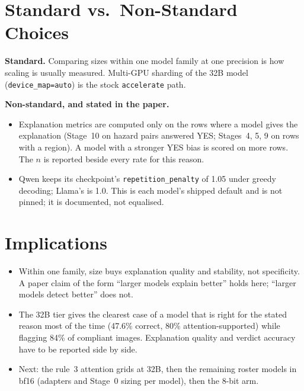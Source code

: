 \section{Standard vs.\ Non-Standard Choices}

\textbf{Standard.} Comparing sizes within one model family at one precision is how scaling is usually
measured. Multi-GPU sharding of the 32B model (\texttt{device\_map=auto}) is the stock \texttt{accelerate}
path.

\textbf{Non-standard, and stated in the paper.}
\begin{itemize}
\item Explanation metrics are computed only on the rows where a model gives the explanation (Stage~10 on
hazard pairs answered YES; Stages~4, 5, 9 on rows with a region). A model with a stronger YES bias is
scored on more rows. The $n$ is reported beside every rate for this reason.
\item Qwen keeps its checkpoint's \texttt{repetition\_penalty} of 1.05 under greedy decoding; Llama's is
1.0. This is each model's shipped default and is not pinned; it is documented, not equalised.
\end{itemize}

\section{Implications}

\begin{itemize}
\item Within one family, size buys explanation quality and stability, not specificity. A paper claim of
the form ``larger models explain better'' holds here; ``larger models detect better'' does not.
\item The 32B tier gives the clearest case of a model that is right for the stated reason most of the time
(47.6\% correct, 80\% attention-supported) while flagging 84\% of compliant images. Explanation quality and
verdict accuracy have to be reported side by side.
\item Next: the rule~3 attention grids at 32B, then the remaining roster models in bf16 (adapters and
Stage~0 sizing per model), then the 8-bit arm.
\end{itemize}
